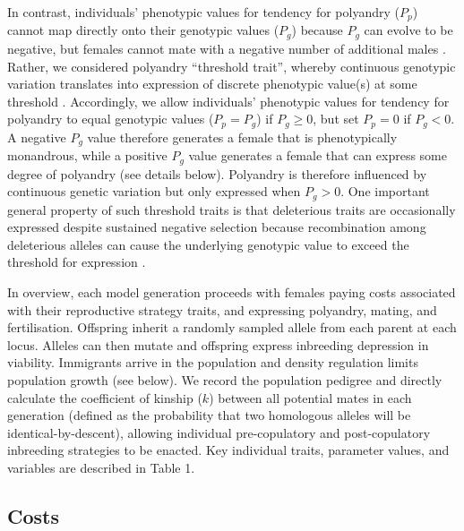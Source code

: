 \documentclass[12pt]{article}
\begin{document}
In contrast, individuals' phenotypic values for tendency for polyandry ($P_{p}$) cannot map directly onto their genotypic values ($P_{g}$) because $P_{g}$ can evolve to be negative, but females cannot mate with a negative number of additional males \cite[e.g.,][]{Shuker2007, Evans2013b}. Rather, we considered polyandry ``threshold trait'', whereby continuous genotypic variation translates into expression of discrete phenotypic value(s) at some threshold \cite[][]{Lynch1998, Roff1996, Roff1998, Duthie}. Accordingly, we allow individuals' phenotypic values for tendency for polyandry to equal genotypic values ($P_{p} = P_{g}$) if $P_{g} \geq 0$, but set $P_{p} = 0$ if $P_{g} < 0$. A negative $P_{g}$ value therefore generates a female that is phenotypically monandrous, while a positive $P_{g}$ value generates a female that can express some degree of polyandry (see details below). Polyandry is therefore influenced by continuous genetic variation but only expressed when $P_{g} > 0$. One important general property of such threshold traits is that deleterious traits are occasionally expressed despite sustained negative selection because recombination among deleterious alleles can cause the underlying genotypic value to exceed the threshold for expression \cite[][]{Roff1996, Roff1998}.

In overview, each model generation proceeds with females paying costs associated with their reproductive strategy traits, and expressing polyandry, mating, and fertilisation. Offspring inherit a randomly sampled allele from each parent at each locus. Alleles can then mutate and offspring express inbreeding depression in viability. Immigrants arrive in the population and density regulation limits population growth (see below). We record the population pedigree and directly calculate the coefficient of kinship ($k$) between all potential mates in each generation (defined as the probability that two homologous alleles will be identical-by-descent), allowing individual pre-copulatory and post-copulatory inbreeding strategies to be enacted. Key individual traits, parameter values, and variables are described in Table 1.

\subsection*{Costs}
\end{document}

